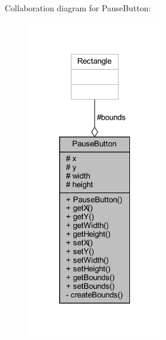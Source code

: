 Collaboration diagram for Pause\+Button\+:\nopagebreak
\begin{figure}[H]
\begin{center}
\leavevmode
\includegraphics[width=169pt]{classui_1_1_pause_button__coll__graph}
\end{center}
\end{figure}
